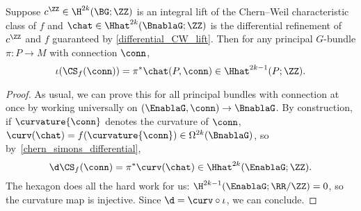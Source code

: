 \begin{prop}
\label{iota_chern_simons}
Suppose $c^\ZZ\in\H^{2k}(\BG;\ZZ)$ is an integral lift of the Chern--Weil characteristic class of $f$ and
$\chat\in\Hhat^{2k}(\BnablaG; \ZZ)$ is the differential refinement of $c^\ZZ$ and $f$ guaranteed by
\cref{differential_CW_lift}. Then for any principal $G$-bundle $\pi\colon P\to M$ with connection $\conn$,
\begin{equation}
	\iota(\CS_f(\conn)) = \pi^*\chat(P, \conn)\in \Hhat^{2k-1}(P;\ZZ).
\end{equation}
\end{prop}
\begin{proof}
As usual, we can prove this for all principal bundles with connection at once by working universally on $(\EnablaG,
\conn)\to \BnablaG$. By construction, if $\curvature{\conn}$ denotes the curvature of $\conn$, $\curv(\chat) =
f(\curvature{\conn})\in\Omega^{2k}(\BnablaG)$, so by~\eqref{chern_simons_differential},
\begin{equation}
	\d\CS_f(\conn) = \pi^*\curv(\chat)\in\Hhat^{2k}(\EnablaG;\ZZ).
\end{equation}
The hexagon does all the hard work for us: $\H^{2k-1}(\EnablaG; \RR/\ZZ) = 0$, so the curvature map is injective.
Since $\d = {\curv}\circ\iota$, we can conclude.
\end{proof}
%
